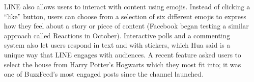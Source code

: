 \documentclass[notoc, symmetric, nobib, nols]{towcenter-guideto-book}
\begin{document}


LINE also allows users to interact with content using emojis. Instead of clicking a ``like'' button, users can choose from a selection of six different emojis to express how they feel about a story or piece of content (Facebook began testing a similar approach called Reactions in October).\autocite{EngadgetFacebook}  Interactive polls and a commenting system also let users respond in text and with stickers, which Hua said is a unique way that LINE engages with audiences. A recent feature asked users to select the house from Harry Potter's Hogwarts which they most fit into; it was one of BuzzFeed's most engaged posts since the channel launched. 
\end{document}
